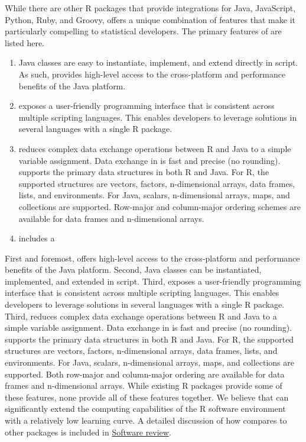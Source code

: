 While there are other R packages that provide integrations for Java, JavaScript, Python, Ruby, and Groovy,  offers a unique combination of features that make it particularly compelling to statistical developers. The primary features of  are listed here.

\begin{enumerate}
\item Java classes are easy to instantiate, implement, and extend directly in script. As such,  provides high-level access to the cross-platform and performance benefits of the Java platform.

\item {} exposes a user-friendly programming interface that is consistent across multiple scripting languages. This enables developers to leverage solutions in several languages with a single R package.

\item {} reduces complex data exchange operations between R and Java to a simple variable assignment. Data exchange in  is fast and precise (no rounding).  supports the primary data structures in both R and Java. For R, the supported structures are vectors, factors, n-dimensional arrays, data frames, lists, and environments. For Java, scalars, n-dimensional arrays, maps, and collections are supported. Row-major and column-major ordering schemes are available for data frames and n-dimensional arrays.

\item {} includes a 
\end{enumerate}

 First and foremost,  offers high-level access to the cross-platform and performance benefits of the Java platform. Second, Java classes can be instantiated, implemented, and extended in script. Third,  exposes a user-friendly programming interface that is consistent across multiple scripting languages. This enables developers to leverage solutions in several languages with a single R package. Third,  reduces complex data exchange operations between R and Java to a simple variable assignment. Data exchange in  is fast and precise (no rounding).  supports the primary data structures in both R and Java. For R, the supported structures are vectors, factors, n-dimensional arrays, data frames, lists, and environments. For Java, scalars, n-dimensional arrays, maps, and collections are supported. Both row-major and column-major ordering are available for data frames and n-dimensional arrays. While existing R packages provide some of these features, none provide all of these features together. We believe that  can significantly extend the computing capabilities of the R software environment with a relatively low learning curve. A detailed discussion of how  compares to other packages is included in \hyperlink{softwarereview}{Software review}.


